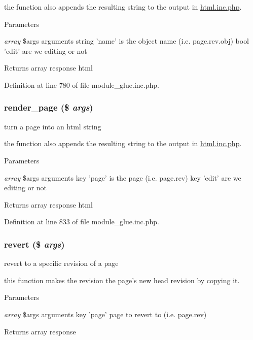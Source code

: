 the function also appends the resulting string to the output in \hyperlink{html_8inc_8php}{html.inc.php}. 
\begin{DoxyParams}{Parameters}
\item[{\em array}]\$args arguments string 'name' is the object name (i.e. page.rev.obj) bool 'edit' are we editing or not \end{DoxyParams}
\begin{DoxyReturn}{Returns}
array response html 
\end{DoxyReturn}


Definition at line 780 of file module\_\-glue.inc.php.

\hypertarget{module__glue_8inc_8php_aab1981a767de519c6c4afb946d748d0a}{
\subsubsection[{render\_\-page}]{\setlength{\rightskip}{0pt plus 5cm}render\_\-page (\$ {\em args})}}
\label{module__glue_8inc_8php_aab1981a767de519c6c4afb946d748d0a}
turn a page into an html string

the function also appends the resulting string to the output in \hyperlink{html_8inc_8php}{html.inc.php}. 
\begin{DoxyParams}{Parameters}
\item[{\em array}]\$args arguments key 'page' is the page (i.e. page.rev) key 'edit' are we editing or not \end{DoxyParams}
\begin{DoxyReturn}{Returns}
array response html 
\end{DoxyReturn}


Definition at line 833 of file module\_\-glue.inc.php.

\hypertarget{module__glue_8inc_8php_ae69e25beb40feedc02d3b850587d20cc}{
\subsubsection[{revert}]{\setlength{\rightskip}{0pt plus 5cm}revert (\$ {\em args})}}
\label{module__glue_8inc_8php_ae69e25beb40feedc02d3b850587d20cc}
revert to a specific revision of a page

this function makes the revision the page's new head revision by copying it. 
\begin{DoxyParams}{Parameters}
\item[{\em array}]\$args arguments key 'page' page to revert to (i.e. page.rev) \end{DoxyParams}
\begin{DoxyReturn}{Returns}
array response 
\end{DoxyReturn}


